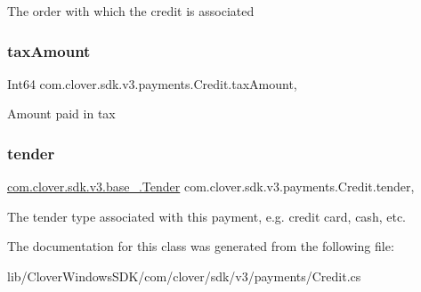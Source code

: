 The order with which the credit is associated 

\mbox{\label{classcom_1_1clover_1_1sdk_1_1v3_1_1payments_1_1_credit_a90650469195d49f730284b3e5e0fc3dd}} 
\subsubsection{\texorpdfstring{tax\+Amount}{taxAmount}}
{\footnotesize\ttfamily Int64 com.\+clover.\+sdk.\+v3.\+payments.\+Credit.\+tax\+Amount\hspace{0.3cm}{\ttfamily [get]}, {\ttfamily [set]}}



Amount paid in tax 

\mbox{\label{classcom_1_1clover_1_1sdk_1_1v3_1_1payments_1_1_credit_a68a74f3bcbf20225574fcd709d579415}} 
\subsubsection{\texorpdfstring{tender}{tender}}
{\footnotesize\ttfamily \hyperlink{classcom_1_1clover_1_1sdk_1_1v3_1_1base___1_1_tender}{com.\+clover.\+sdk.\+v3.\+base\+\_\+.\+Tender} com.\+clover.\+sdk.\+v3.\+payments.\+Credit.\+tender\hspace{0.3cm}{\ttfamily [get]}, {\ttfamily [set]}}



The tender type associated with this payment, e.\+g. credit card, cash, etc. 



The documentation for this class was generated from the following file\+:\begin{DoxyCompactItemize}
\item 
lib/\+Clover\+Windows\+S\+D\+K/com/clover/sdk/v3/payments/Credit.\+cs\end{DoxyCompactItemize}

